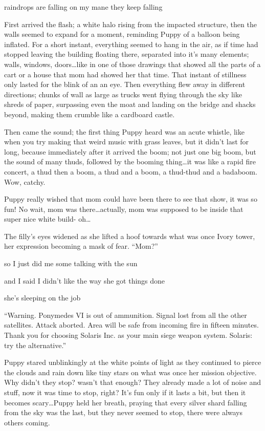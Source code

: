 \begin{song}
    raindrops are falling on my mane they keep falling
\end{song}

First arrived the flash; a white halo rising from the impacted structure, then the walls seemed to expand for a moment, reminding Puppy of a balloon being inflated. For a short instant, everything seemed to hang in the air, as if time had stopped leaving the building floating there, separated into it's many elements; walls, windows, doors\dots like in one of those drawings that showed all the parts of a cart or a house that mom had showed her that time. That instant of stillness only lasted for the blink of an an eye. Then everything flew away in different directions; chunks of wall as large as trucks went flying through the sky like shreds of paper, surpassing even the moat and landing on the bridge and shacks beyond, making them crumble like a cardboard castle.

Then came the sound; the first thing Puppy heard was an acute whistle, like when you try making that weird music with grass leaves, but it didn't last for long, because immediately after it arrived the boom; not just one big boom, but the sound of many thuds, followed by the booming thing\dots it was like a rapid fire concert, a thud then a boom, a thud and a boom, a thud-thud and a badaboom. Wow, catchy.

Puppy really wished that mom could have been there to see that show, it was so fun! No wait, mom was there\dots actually, mom was supposed to be inside that super nice white build- oh\dots

The filly's eyes widened as she lifted a hoof towards what was once Ivory tower, her expression becoming a mask of fear. ``Mom?''


\begin{song}
so I just did me some talking with the sun

and I said I didn't like the way she got things done

she's sleeping on the job
\end{song}

``{\mt Warning. Ponymedes VI is out of ammunition. Signal lost from all the other satellites. Attack aborted. Area will be safe from incoming fire in fifteen minutes. Thank you for choosing Solaris Inc. as your main siege weapon system. Solaris: try the alternative.}''

Puppy stared unblinkingly at the white points of light as they continued to pierce the clouds and rain down like tiny stars on what was once her mission objective. Why didn't they stop? wasn't that enough? They already made a lot of noise and stuff, now it was time to stop, right? It's fun only if it lasts a bit, but then it becomes scary\dots Puppy held her breath, praying that every silver shard falling from the sky was the last, but they never seemed to stop, there were always others coming.

